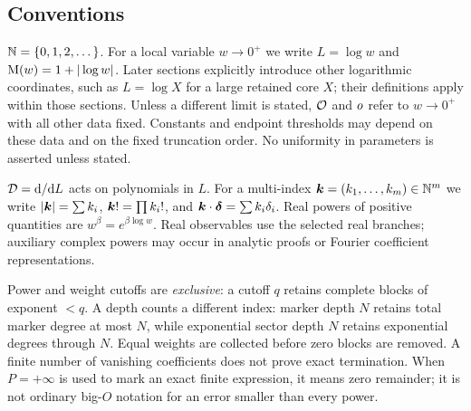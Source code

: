 \subsection{Conventions}

$\mathbb N=\{0,1,2,\dots\}$. For a local variable $w\to0^+$ we write
$L=\log w$ and $\mathrm M(w)=1+|\log w|$. Later sections explicitly introduce
other logarithmic coordinates, such as $L=\log X$ for a large retained
core $X$; their definitions apply within those sections. Unless a different
limit is stated, $\mathcal O$ and $o$ refer to $w\to0^+$ with all other data
fixed. Constants and endpoint thresholds may depend on these data and on
the fixed truncation order. No uniformity in parameters is asserted unless
stated.

$\mathcal D=\mathrm d/\mathrm d L$ acts on polynomials in $L$. For a multi-index
$\boldsymbol k=(k_1,\dots,k_m)\in\mathbb N^m$ we write $|\boldsymbol k|=\sum k_i$,
$\boldsymbol k!=\prod k_i!$, and $\boldsymbol k\cdot\boldsymbol\delta=\sum k_i\delta_i$.
Real powers of positive quantities are $w^\beta=e^{\beta\log w}$.
Real observables use the selected real branches; auxiliary complex powers
may occur in analytic proofs or Fourier coefficient representations.

Power and weight cutoffs are \emph{exclusive}: a cutoff $q$ retains
complete blocks of exponent $<q$. A depth counts a different index:
marker depth $N$ retains total marker degree at most $N$, while exponential
sector depth $N$ retains exponential degrees through $N$. Equal weights
are collected before zero blocks are removed. A finite number of vanishing
coefficients does not prove exact termination. When $P=+\infty$ is used
to mark an exact finite expression, it means zero remainder; it is not
ordinary big-$O$ notation for an error smaller than every power.
